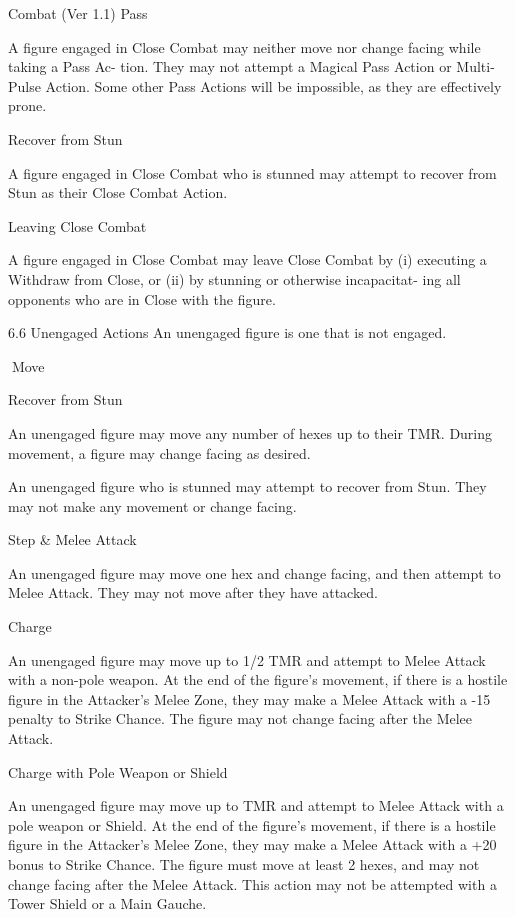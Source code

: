 \begin{Chapter}{Combat (Ver 1.1)}
Pass 

A  figure  engaged  in  Close  Combat  may  neither 
move  nor  change  facing  while  taking  a  Pass  Ac-
tion. They may not attempt a  Magical Pass Action 
or  Multi-Pulse  Action.  Some  other  Pass  Actions 
will be impossible, as they are effectively prone. 

Recover from Stun 

A figure engaged in Close Combat who is stunned 
may  attempt  to  recover  from  Stun  as  their  Close 
Combat Action. 

Leaving Close Combat 

A  figure  engaged  in  Close  Combat  may  leave 
Close  Combat  by  (i)  executing  a  Withdraw  from 
Close, or (ii) by stunning or otherwise incapacitat-
ing all opponents who are in Close with the figure. 

6.6 Unengaged Actions 
An unengaged figure is one that is not engaged. 

Move 

Recover from Stun 

An  unengaged  figure  may  move  any  number  of 
hexes up to their TMR. During movement, a figure 
may change facing as desired. 

An  unengaged  figure  who  is  stunned  may  attempt 
to  recover  from  Stun.  They  may  not  make  any 
movement or change facing. 

Step \& Melee Attack 

An  unengaged  figure  may  move  one  hex  and 
change  facing,  and  then  attempt  to  Melee  Attack. 
They may not move after they have attacked. 

Charge 

An  unengaged  figure  may  move  up  to  1/2  TMR 
and  attempt  to  Melee  Attack  with  a  non-pole 
weapon.  At  the  end  of  the  figure’s  movement,  if 
there  is  a  hostile  figure  in  the  Attacker’s  Melee 
Zone,  they  may  make  a  Melee  Attack  with  a  -15 
penalty  to  Strike  Chance.  The  figure  may  not 
change facing after the Melee Attack. 

Charge with Pole Weapon or Shield 

An  unengaged  figure  may  move  up  to  TMR  and 
attempt  to  Melee  Attack  with  a  pole  weapon  or 
Shield.  At  the  end  of  the  figure’s  movement,  if 
there  is  a  hostile  figure  in  the  Attacker’s  Melee 
Zone,  they  may  make  a  Melee  Attack  with  a  +20 
bonus  to  Strike  Chance.  The  figure  must  move  at 
least 2 hexes, and may not change facing after the 
Melee  Attack.  This  action  may  not  be  attempted 
with a Tower Shield or a Main Gauche. 


\end{Chapter}
